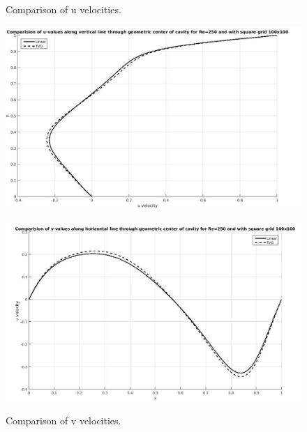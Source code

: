\documentclass[12pt]{elsarticle}
\begin{document}
	\begin{figure}[h]
		\caption{Comparison of u velocities.}
		\centering\includegraphics[width=1.0\linewidth]{27_uvalues_tvd_linear_re_250_100_100}
		\caption{Comparison of v velocities.}
		\centering\includegraphics[width=1.0\linewidth]{28_vvalues_tvd_linear_re_250_100_100}
		\label{fig:28_vvalues_tvd_linear_re_250_100_100}
	\end{figure}
	
\end{document}
